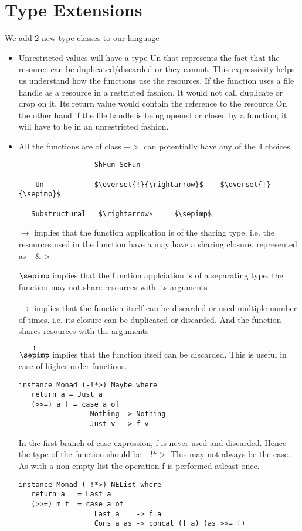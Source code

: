 \section{Type Extensions}

We add 2 new type classes to our language
\begin{itemize}
\item Unrestricted values will have a type Un
  that represents the fact that the resource can be
  duplicated/discarded or they cannot.
  This expressivity helps us understand how the functions
  use the resources. If the function uses a file handle as a resource
  in a restricted fashion. It would not call duplicate or drop on it.
  Its return value would contain the reference to the resource
  On the other hand if the file handle is being opened or closed
  by a function, it will have to be in an unrestricted fashion.
\item All the functions are of class $->$ can potentially have any of the 4 choices
  \begin{lstlisting}
                  ShFun SeFun

    Un            $\overset{!}{\rightarrow}$    $\overset{!}{\sepimp}$

   Substructural   $\rightarrow$     $\sepimp$
  \end{lstlisting}

  $\rightarrow$ implies that the function application is of the sharing type.
  i.e. the resources used in the function have a may have a sharing closure.
  represented as $-\&>$

  $\sepimp$ implies that the function applciation is of a separating type.
  the function may not share resources with its arguments

  $\overset{!}{\rightarrow}$ implies that the function itself can be discarded
  or used multiple number of times. i.e. its closure
  can be duplicated or discarded. And the function shares resources with the arguments

  $\overset{!}{\sepimp}$ implies that the function itself can be discarded.
  This is useful in case of higher order functions.

\begin{verbatim}
instance Monad (-!*>) Maybe where
   return a = Just a
   (>>=) a f = case a of
                 Nothing -> Nothing
                 Just v  -> f v
\end{verbatim}

  In the first branch of case expression, f is never used and discarded. Hence
  the type of the function should be $-!*>$
  This may not always be the case. As with a non-empty list
  the operation f is performed atleast once.

\begin{verbatim}
instance Monad (-!*>) NEList where
   return a   = Last a
   (>>=) m f  = case a of
                  Last a    -> f a
                  Cons a as -> concat (f a) (as >>= f)
\end{verbatim}

\end{itemize}


